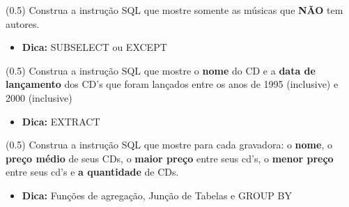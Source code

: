 \documentclass[12pt]{exam}
\begin{document}
\begin{questions}
\question (0.5)  Construa a instrução SQL que mostre somente as músicas que \textbf{NÃO} tem autores.

\begin{itemize}
    \item \textbf{Dica:} SUBSELECT ou EXCEPT
\end{itemize}



\question (0.5) Construa a instrução SQL que mostre o \textbf{nome} do CD e a \textbf{data de lançamento} dos CD's que foram lançados entre os anos de 1995 (inclusive) e 2000 (inclusive)

\begin{itemize}
    \item \textbf{Dica:} EXTRACT
\end{itemize}




\question (0.5) Construa a instrução SQL que mostre para cada gravadora: o \textbf{nome}, o \textbf{preço médio} de seus CDs, o \textbf{maior preço} entre seus cd's, o \textbf{menor preço} entre seus cd's e \textbf{a quantidade} de CDs.

\begin{itemize}
    \item \textbf{Dica:} Funções de agregação, Junção de Tabelas e GROUP BY
\end{itemize}


\end{questions}
\end{document}
